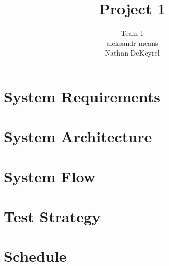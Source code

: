 \documentclass[twoside,11pt]{article}
\begin{document}
\title{Project 1}

\author{\name Team 1 \\
       \AND
       \name aleksandr means \\
       \AND
       \name Nathan DeKeyrel \\}

\maketitle

\section{System Requirements}



\section{System Architecture}



\section{System Flow}

\section{Test Strategy}

\section{Schedule}
\end{document}
